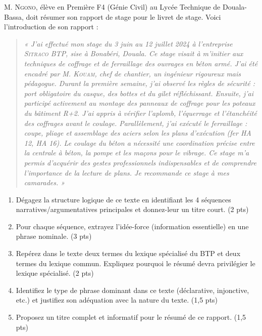 \documentclass[11pt]{article}
\begin{document}
\begin{exercice}
\label{exo:rapport}
M. \textsc{Ngono}, élève en Première F4 (Génie Civil) au Lycée Technique de Douala-Bassa, doit résumer son rapport de stage pour le livret de stage. Voici l'introduction de son rapport :

\begin{quote}
\textit{« J'ai effectué mon stage du 3 juin au 12 juillet 2024 à l'entreprise \textsc{Sitraco} BTP, sise à Bonabéri, Douala. Ce stage visait à m'initier aux techniques de coffrage et de ferraillage des ouvrages en béton armé. J'ai été encadré par M. \textsc{Kouam}, chef de chantier, un ingénieur rigoureux mais pédagogue. Durant la première semaine, j'ai observé les règles de sécurité : port obligatoire du casque, des bottes et du gilet réfléchissant. Ensuite, j'ai participé activement au montage des panneaux de coffrage pour les poteaux du bâtiment R+2. J'ai appris à vérifier l'aplomb, l'équerrage et l'étanchéité des coffrages avant le coulage. Parallèlement, j'ai exécuté le ferraillage : coupe, pliage et assemblage des aciers selon les plans d'exécution (fer HA 12, HA 16). Le coulage du béton a nécessité une coordination précise entre la centrale à béton, la pompe et les maçons pour le vibrage. Ce stage m'a permis d'acquérir des gestes professionnels indispensables et de comprendre l'importance de la lecture de plans. Je recommande ce stage à mes camarades. »}
\end{quote}

\begin{enumerate}
    \item Dégagez la structure logique de ce texte en identifiant les 4 séquences narratives/argumentatives principales et donnez-leur un titre court. \hfill (2 pts)
    \item Pour chaque séquence, extrayez l'idée-force (information essentielle) en une phrase nominale. \hfill (3 pts)
    \item Repérez dans le texte deux termes du lexique spécialisé du BTP et deux termes du lexique commun. Expliquez pourquoi le résumé devra privilégier le lexique spécialisé. \hfill (2 pts)
    \item Identifiez le type de phrase dominant dans ce texte (déclarative, injonctive, etc.) et justifiez son adéquation avec la nature du texte. \hfill (1,5 pts)
    \item Proposez un titre complet et informatif pour le résumé de ce rapport. \hfill (1,5 pts)
\end{enumerate}
\end{exercice}
\end{document}
